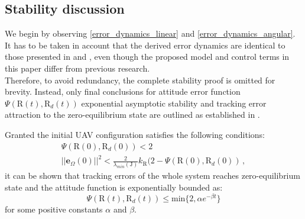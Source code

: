 \subsection{Stability discussion}

We begin by observing \eqref{error_dynamics_linear} and \eqref{error_dynamics_angular}. 
It has to be taken in account that the derived error dynamics are identical to those presented in \cite{LeeClanak1} and \cite{LeeClanak4}, even though the proposed model and control terms in this paper differ from previous research. \\
Therefore, to avoid redundancy, the complete stability proof is omitted for brevity. Instead, only final conclusions for attitude error function $\Psi (\text{R}(t), \text{R}_d(t))$ exponential asymptotic stability and tracking error attraction to the zero-equilibrium state are outlined as established in \cite{LeeClanak1}.

Granted the initial UAV configuration satisfies the following conditions:
\begin{gather}
	\Psi (\text{R}(0), \text{R}_d(0)) < 2 \\
	||\textbf{e}_\Omega(0)||^2 < \frac{2}{\lambda_{min}(\text{J})}k_\text{R}(2 - \Psi(\text{R}(0), \text{R}_d(0)) \, ,
\end{gather}
it can be shown that tracking errors of the whole system reaches zero-equilibrium state and the attitude function is exponentially bounded as:
\begin{equation}
	\Psi(\text{R}(t), \text{R}_d(t)) \leq \text{min}\{2, \alpha e^{-\beta t} \}
\end{equation}
for some positive constants $\alpha$ and $\beta$.